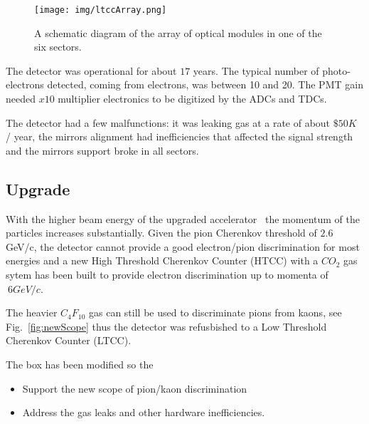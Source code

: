 \begin{figure}[h]
	\centering
	\texttt{[image: img/ltccArray.png]}
	\caption{A schematic diagram of the array of optical modules in one of the six sectors.}
	\label{fig:ltccArray}
\end{figure}

The detector was operational for about $17$ years. The typical number of photo-electrons detected, coming from electrons, was between 10 and 20.
The PMT gain needed $x10$ multiplier electronics to be digitized by the ADCs and TDCs.

The detector had a few malfunctions: it was leaking gas at a rate of about $\$50K$ / year, the mirrors alignment had inefficiencies that affected
the signal strength and the mirrors support broke in all sectors.


\subsection{Upgrade}

With the higher beam energy of the upgraded accelerator~\cite{TDR12} the momentum of the particles increases substantially.
Given the pion Cherenkov threshold of $2.6$ GeV/c, the detector cannot provide a good electron/pion discrimination for most energies and a new
High Threshold Cherenkov Counter (HTCC) with a $CO_2$ gas sytem has been built to provide electron discrimination up to momenta of $~6 GeV/c$.

The heavier $C_4F_{10}$ gas can still be used to discriminate pions from kaons, see Fig.~\ref{fig:newScope} thus the detector was refusbished
to a Low Threshold Cherenkov Counter (LTCC).

The box has been modified so the

\begin{itemize}
	\item Support the new scope of pion/kaon discrimination
	\item Address the gas leaks and other hardware inefficiencies.
\end{itemize}

